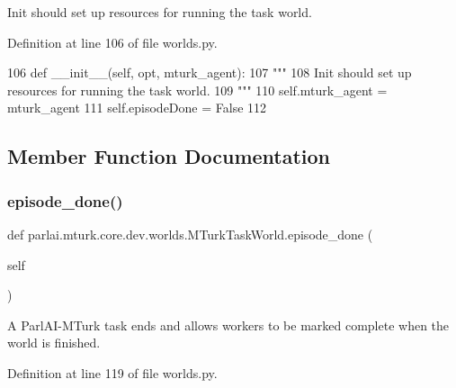 \begin{DoxyVerb}Init should set up resources for running the task world.
\end{DoxyVerb}
 

Definition at line 106 of file worlds.\+py.


\begin{DoxyCode}
106     \textcolor{keyword}{def }\_\_init\_\_(self, opt, mturk\_agent):
107         \textcolor{stringliteral}{"""}
108 \textcolor{stringliteral}{        Init should set up resources for running the task world.}
109 \textcolor{stringliteral}{        """}
110         self.mturk\_agent = mturk\_agent
111         self.episodeDone = \textcolor{keyword}{False}
112 
\end{DoxyCode}


\subsection{Member Function Documentation}
\mbox{\label{classparlai_1_1mturk_1_1core_1_1dev_1_1worlds_1_1MTurkTaskWorld_a165fa922d9f59c93bbd53aaef7442ce0}} 
\subsubsection{\texorpdfstring{episode\+\_\+done()}{episode\_done()}}
{\footnotesize\ttfamily def parlai.\+mturk.\+core.\+dev.\+worlds.\+M\+Turk\+Task\+World.\+episode\+\_\+done (\begin{DoxyParamCaption}\item[{}]{self }\end{DoxyParamCaption})}

\begin{DoxyVerb}A ParlAI-MTurk task ends and allows workers to be marked complete when the world
is finished.
\end{DoxyVerb}
 

Definition at line 119 of file worlds.\+py.


